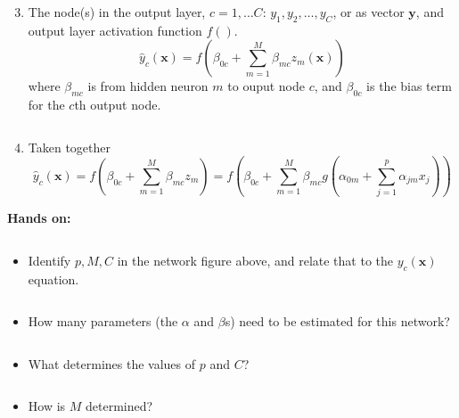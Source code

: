 \documentclass[
  10pt,
  ignorenonframetext,
]{beamer}
\providecommand{\tightlist}{%
  \setlength{\itemsep}{0pt}\setlength{\parskip}{0pt}}
\begin{document}
\begin{frame}
\begin{enumerate}
\setcounter{enumi}{2}
\tightlist
\item
  The node(s) in the output layer, \(c=1,\ldots C\):
  \(y_1, y_2, \ldots, y_C\), or as vector \({\boldsymbol y}\), and
  output layer activation function \(f()\). \[
  \hat{y}_c({\boldsymbol x})=f(\beta_{0c}+\sum_{m=1}^M \beta_{mc}z_{m}({\boldsymbol x}))
  \] where \(\beta_{mc}\) is from hidden neuron \(m\) to ouput node
  \(c\), and \(\beta_{0c}\) is the bias term for the \(c\)th output
  node.
\end{enumerate}

\(~\)

\begin{enumerate}
\setcounter{enumi}{3}
\tightlist
\item
  Taken together \[
  \hat{y}_c({\boldsymbol x})=f(\beta_{0c}+\sum_{m=1}^M \beta_{mc}z_{m})=f(\beta_{0c}+\sum_{m=1}^M \beta_{mc}g(\alpha_{0m}+\sum_{j=1}^p \alpha_{jm}x_{j}))
  \]
\end{enumerate}
\end{frame}

\begin{frame}
\textbf{Hands on:}

\(~\)

\begin{itemize}
\tightlist
\item
  Identify \(p, M, C\) in the network figure above, and relate that to
  the \(y_{c}({\boldsymbol x})\) equation.
\end{itemize}

\(~\)

\begin{itemize}
\tightlist
\item
  How many parameters (the \(\alpha\) and \(\beta\)s) need to be
  estimated for this network?
\end{itemize}

\(~\)

\begin{itemize}
\tightlist
\item
  What determines the values of \(p\) and \(C\)?
\end{itemize}

\(~\)

\begin{itemize}
\tightlist
\item
  How is \(M\) determined?
\end{itemize}
\end{frame}
\end{document}
